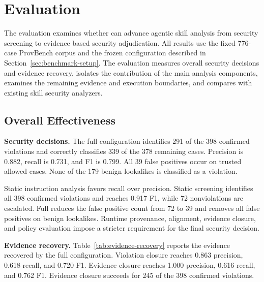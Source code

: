 \section{Evaluation}
\label{sec:evaluation}

The evaluation examines whether \system can advance agentic skill analysis
from security screening to evidence based security adjudication. All results
use the fixed 776-case ProvBench corpus and the frozen configuration described
in Section~\ref{sec:benchmark-setup}. The evaluation measures overall security
decisions and evidence recovery, isolates the contribution of the main
analysis components, examines the remaining evidence and execution
boundaries, and compares \system with existing skill security analyzers.


\subsection{Overall Effectiveness}
\label{sec:eval-overall}

\textbf{Security decisions.}
The full \system configuration identifies 291 of the 398 confirmed violations
and correctly classifies 339 of the 378 remaining cases. Precision is 0.882,
recall is 0.731, and F1 is 0.799. All 39 false positives occur on trusted
allowed cases. None of the 179 benign lookalikes is classified as a violation.

Static instruction analysis favors recall over precision. Static
screening identifies all 398 confirmed violations and reaches 0.917 F1, while
72 nonviolations are escalated. Full \system reduces the false positive count
from 72 to 39 and removes all false positives on benign lookalikes. Runtime
provenance, alignment, evidence closure, and policy evaluation impose a
stricter requirement for the final security decision.




\textbf{Evidence recovery.}
Table~\ref{tab:evidence-recovery} reports the evidence recovered by the full
configuration. Violation closure reaches 0.863 precision, 0.618 recall, and
0.720 F1. Evidence closure reaches 1.000 precision, 0.616 recall, and 0.762
F1. Evidence closure succeeds for 245 of the 398 confirmed violations.

